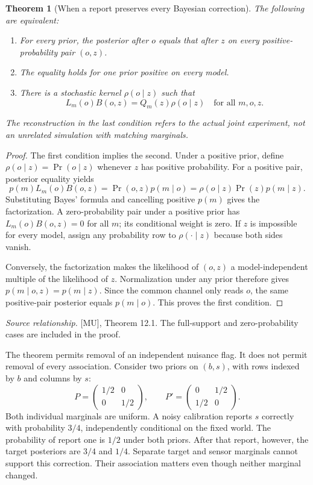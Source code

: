\documentclass[11pt,oneside,openany]{book}
\newtheorem{theorem}{Theorem}[chapter]
\theoremstyle{definition}\newtheorem{definition}[theorem]{Definition}
\newcommand{\source}[1]{\par{\small\textit{Source relationship.} #1}\par}
\begin{document}
\begin{theorem}[When a report preserves every Bayesian correction]\label{r:bayes}
The following are equivalent:
\begin{enumerate}
\item For every prior, the posterior after $o$ equals that after $z$ on every positive-probability pair $(o,z)$.
\item The equality holds for one prior positive on every model.
\item There is a stochastic kernel $\rho(o\mid z)$ such that
\[
L_m(o)B(o,z)=Q_m(z)\rho(o\mid z)\quad\text{for all }m,o,z.
\]
\end{enumerate}
The reconstruction in the last condition refers to the actual joint experiment, not an unrelated simulation with matching marginals.
\end{theorem}
\begin{proof}
The first condition implies the second. Under a positive prior, define $\rho(o\mid z)=\Pr(o\mid z)$ whenever $z$ has positive probability. For a positive pair, posterior equality yields
\[
p(m)L_m(o)B(o,z)=\Pr(o,z)p(m\mid o)
=\rho(o\mid z)\Pr(z)p(m\mid z).
\]
Substituting Bayes' formula and cancelling positive $p(m)$ gives the factorization. A zero-probability pair under a positive prior has $L_m(o)B(o,z)=0$ for all $m$; its conditional weight is zero. If $z$ is impossible for every model, assign any probability row to $\rho(\cdot\mid z)$ because both sides vanish.

Conversely, the factorization makes the likelihood of $(o,z)$ a model-independent multiple of the likelihood of $z$. Normalization under any prior therefore gives $p(m\mid o,z)=p(m\mid z)$. Since the common channel only reads $o$, the same positive-pair posterior equals $p(m\mid o)$. This proves the first condition.
\end{proof}
\source{[MU], Theorem 12.1. The full-support and zero-probability cases are included in the proof.}

The theorem permits removal of an independent nuisance flag. It does not permit removal of every association. Consider two priors on $(b,s)$, with rows indexed by $b$ and columns by $s$:
\[
P=\begin{pmatrix}1/2&0\\0&1/2\end{pmatrix},\qquad
P'=\begin{pmatrix}0&1/2\\1/2&0\end{pmatrix}.
\]
Both individual marginals are uniform. A noisy calibration reports $s$ correctly with probability $3/4$, independently conditional on the fixed world. The probability of report one is $1/2$ under both priors. After that report, however, the target posteriors are $3/4$ and $1/4$. Separate target and sensor marginals cannot support this correction. Their association matters even though neither marginal changed.
\end{document}

